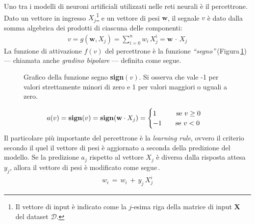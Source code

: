 Uno tra i modelli di neuroni artificiali utilizzati nelle reti neurali è il percettrone. Dato un vettore in ingresso $X_j$\footnote{Il vettore di input è indicato come la $j$-esima riga della matrice di input $\mathbf{X}$ del dataset $\mathcal{D}$.} e un vettore di pesi $\mathbf{w}$, il segnale $v$ è dato dalla somma algebrica dei prodotti di ciascuna delle componenti:
% 
\begin{gather*}
    v = g\left(\mathbf{w}, X_j\right) = \sum_{i = 0}^n w_i\,X_j^i = \mathbf{w} \, \cdot \,  X_j
\end{gather*}
% 
\noindent La funzione di attivazione $f(v)$ del percettrone è la funzione \textsl{``segno''}\,(Figura\,\ref{fig:sign-function}) — chiamata anche \textsl{gradino bipolare} — definita come segue. 
% 
\begin{figure}[!b]
    \centering
    
    \caption[Grafico della funzione segno \textsl{sign}$(v)$.]{Grafico della funzione segno \textbf{sign}$(v)$. Si osserva che vale -1 per valori strettamente minori di zero e 1 per valori maggiori o uguali a zero.}\label{fig:sign-function}
\end{figure}
% 
\begin{gather*}
    a(v) = \text{\textbf{sign}}(v) = \text{\textbf{sign}}(\mathbf{w} \cdot X_j) =
    \begin{cases}
        1 \hspace{29px} \text{se } v\geq0\\
        -1 \hspace{20px} \text{se } v<0
    \end{cases}
\end{gather*}
% 
\noindent Il particolare più importante del percettrone è la \textit{learning rule}, ovvero il criterio secondo il quel il vettore di pesi è aggiornato a seconda della predizione del modello. Se la predizione $a_j$ rispetto al vettore $X_j$ è diversa dalla risposta attesa $y_j$, allora il vettore di pesi è modificato come segue\,\cite{nielsen2015neural, flasinski2016introduction}.
% 
\begin{gather*}
    w_i \, = \, w_i \, + \, y_j\,X_j^i
\end{gather*}

